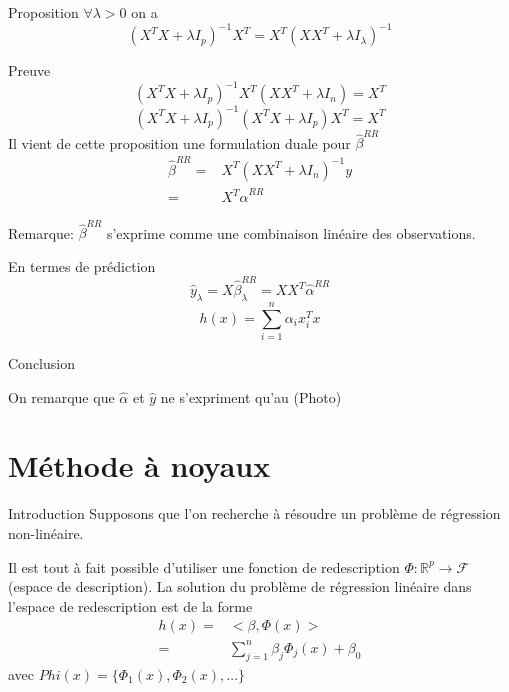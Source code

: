\documentclass{article}
\begin{document}
Proposition
$\forall \lambda>0$ on a 
\begin{equation}
(X^TX+\lambda I_p)^{-1}X^T=X^T(XX^T+\lambda I_\lambda)^{-1}
\end{equation}

Preuve
\begin{equation}
(X^TX+\lambda I_p)^{-1}X^T(XX^T+\lambda I_n)=X^T
\end{equation}
\begin{equation}
(X^TX+\lambda I_p)^{-1}(X^TX+\lambda I_p)X^T=X^T
\end{equation}
Il vient de cette proposition une formulation duale pour $\hat{\beta}^{RR}$
\begin{equation}
\begin{split}
\hat{\beta}^{RR}=&X^T(XX^T+\lambda I_n)^{-1}y\\
=&X^T\hat{\alpha}^{RR}
\end{split}
\end{equation}

Remarque: $\hat{\beta}^{RR}$ s'exprime comme une combinaison lin\'eaire des observations.

En termes de pr\'ediction
\begin{equation}
\hat{y}_{\lambda}=X\hat{\beta}_\lambda^{RR}=XX^T\hat{\alpha}^{RR}
\end{equation}
\begin{equation}
h(x)=\sum_{i=1}^n \alpha_i x_i^Tx
\end{equation}

Conclusion

On remarque que $\hat{\alpha}$ et $\hat{y}$ ne s'expriment qu'au
(Photo)

\section{M\'ethode \`a noyaux}
Introduction Supposons que l'on recherche \`a r\'esoudre un probl\`eme de r\'egression non-lin\'eaire.

Il est tout \`a fait possible d'utiliser une fonction de redescription $\Phi:\mathbb{R}^p\to\mathcal{F}$(espace de description).
La solution du probl\`eme de r\'egression lin\'eaire dans l'espace de redescription est de la forme 
\begin{equation}
\begin{split}
h(x)=&<\beta,\Phi(x)>\\
=&\sum_{j=1}^n\beta_j\Phi_j(x)+\beta_0
\end{split}
\end{equation}
avec $Phi(x)=\{\Phi_1(x),\Phi_2(x),\ldots\}$
\end{document}
